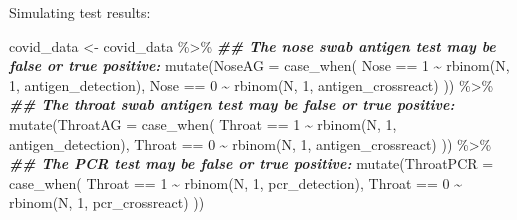 \documentclass[
  ignorenonframetext,
  aspectratio=169,
]{beamer}
\newenvironment{Shaded}{\begin{snugshade}}{\end{snugshade}}
\newcommand{\AttributeTok}[1]{\textcolor[rgb]{0.77,0.63,0.00}{#1}}
\newcommand{\DecValTok}[1]{\textcolor[rgb]{0.00,0.00,0.81}{#1}}
\newcommand{\DocumentationTok}[1]{\textcolor[rgb]{0.56,0.35,0.01}{\textbf{\textit{#1}}}}
\newcommand{\FunctionTok}[1]{\textcolor[rgb]{0.00,0.00,0.00}{#1}}
\newcommand{\NormalTok}[1]{#1}
\newcommand{\OtherTok}[1]{\textcolor[rgb]{0.56,0.35,0.01}{#1}}
\newcommand{\SpecialCharTok}[1]{\textcolor[rgb]{0.00,0.00,0.00}{#1}}
\begin{document}
\begin{frame}[fragile]
Simulating test results:

\scriptsize

\begin{Shaded}
\begin{Highlighting}[]
\NormalTok{covid\_data }\OtherTok{\textless{}{-}}\NormalTok{ covid\_data }\SpecialCharTok{\%\textgreater{}\%}
  \DocumentationTok{\#\# The nose swab antigen test may be false or true positive:}
  \FunctionTok{mutate}\NormalTok{(}\AttributeTok{NoseAG =} \FunctionTok{case\_when}\NormalTok{(}
\NormalTok{    Nose }\SpecialCharTok{==} \DecValTok{1} \SpecialCharTok{\textasciitilde{}} \FunctionTok{rbinom}\NormalTok{(N, }\DecValTok{1}\NormalTok{, antigen\_detection),}
\NormalTok{    Nose }\SpecialCharTok{==} \DecValTok{0} \SpecialCharTok{\textasciitilde{}} \FunctionTok{rbinom}\NormalTok{(N, }\DecValTok{1}\NormalTok{, antigen\_crossreact)}
\NormalTok{  )) }\SpecialCharTok{\%\textgreater{}\%}
  \DocumentationTok{\#\# The throat swab antigen test may be false or true positive:}
  \FunctionTok{mutate}\NormalTok{(}\AttributeTok{ThroatAG =} \FunctionTok{case\_when}\NormalTok{(}
\NormalTok{    Throat }\SpecialCharTok{==} \DecValTok{1} \SpecialCharTok{\textasciitilde{}} \FunctionTok{rbinom}\NormalTok{(N, }\DecValTok{1}\NormalTok{, antigen\_detection),}
\NormalTok{    Throat }\SpecialCharTok{==} \DecValTok{0} \SpecialCharTok{\textasciitilde{}} \FunctionTok{rbinom}\NormalTok{(N, }\DecValTok{1}\NormalTok{, antigen\_crossreact)}
\NormalTok{  )) }\SpecialCharTok{\%\textgreater{}\%}
  \DocumentationTok{\#\# The PCR test may be false or true positive:}
  \FunctionTok{mutate}\NormalTok{(}\AttributeTok{ThroatPCR =} \FunctionTok{case\_when}\NormalTok{(}
\NormalTok{    Throat }\SpecialCharTok{==} \DecValTok{1} \SpecialCharTok{\textasciitilde{}} \FunctionTok{rbinom}\NormalTok{(N, }\DecValTok{1}\NormalTok{, pcr\_detection),}
\NormalTok{    Throat }\SpecialCharTok{==} \DecValTok{0} \SpecialCharTok{\textasciitilde{}} \FunctionTok{rbinom}\NormalTok{(N, }\DecValTok{1}\NormalTok{, pcr\_crossreact)}
\NormalTok{  ))}
\end{Highlighting}
\end{Shaded}

\normalsize
\end{frame}
\end{document}
